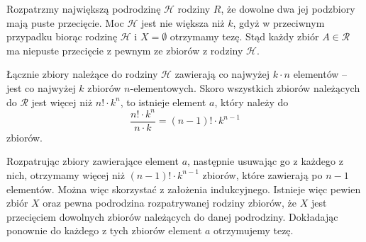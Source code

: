 \vspace{10px}

\noindent
Rozpatrzmy największą podrodzinę $\mathcal{H}$ rodziny $R$, że dowolne dwa jej podzbiory mają puste przecięcie. Moc $\mathcal{H}$ jest nie większa niż $k$, gdyż w przeciwnym przypadku biorąc rodzinę $\mathcal{H}$ i $X = \emptyset$ otrzymamy tezę. Stąd każdy zbiór $A \in \mathcal{R}$ ma niepuste przecięcie z pewnym ze zbiorów z rodziny $\mathcal{H}$.

\vspace{10px}

\noindent
Łącznie zbiory należące do rodziny $\mathcal{H}$ zawierają co najwyżej $k \cdot n$ elementów -- jest co najwyżej $k$ zbiorów $n$-elementowych. Skoro wszystkich zbiorów należących do $\mathcal{R}$ jest więcej niż $n! \cdot k^{n}$, to istnieje element $a$, który należy do
\[
	\frac{n! \cdot k^{n}}{n \cdot k} = (n - 1)! \cdot k^{n - 1}
\]
zbiorów.

\vspace{10px}

\noindent
Rozpatrując zbiory zawierające element $a$, następnie usuwając go z każdego z nich, otrzymamy więcej niż $(n - 1)! \cdot k^{n - 1}$ zbiorów, które zawierają po $n - 1$ elementów. Można więc skorzystać z założenia indukcyjnego. Istnieje więc pewien zbiór $X$ oraz pewna podrodzina rozpatrywanej rodziny zbiorów, że $X$ jest przecięciem dowolnych zbiorów należących do danej podrodziny. Dokładając ponownie do każdego z tych zbiorów element $a$ otrzymujemy tezę.




